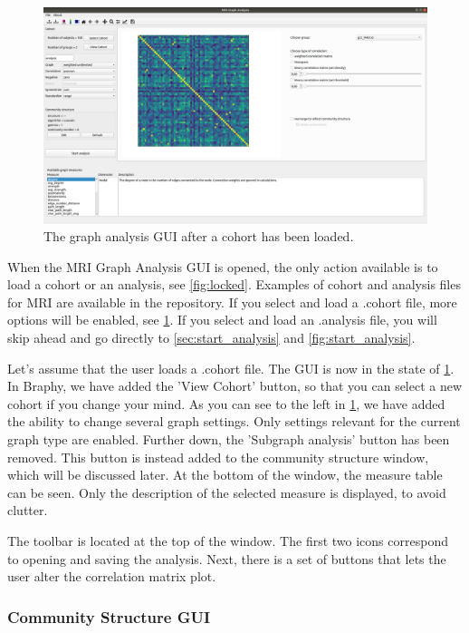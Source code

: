 \documentclass{article}
\begin{document}
\begin{figure}[h]
    \centering
    \includegraphics[width=\linewidth]{graph_analysis_cohort.png}
    \caption{The graph analysis GUI after a cohort has been loaded.}
    \label{fig:started}
\end{figure}

When the MRI Graph Analysis GUI is opened, the only action available is to load a cohort or an analysis, see \cref{fig:locked}. Examples of cohort and analysis files for MRI are available in the repository. If you select and load a .cohort file, more options will be enabled, see \cref{fig:started}. If you select and load an .analysis file, you will skip ahead and go directly to \cref{sec:start_analysis} and \cref{fig:start_analysis}.

Let's assume that the user loads a .cohort file. The GUI is now in the state of \cref{fig:started}. In Braphy, we have added the 'View Cohort' button, so that you can select a new cohort if you change your mind. As you can see to the left in \cref{fig:started}, we have added the ability to change several graph settings. Only settings relevant for the current graph type are enabled. Further down, the 'Subgraph analysis' button has been removed. This button is instead added to the community structure window, which will be discussed later. At the bottom of the window, the measure table can be seen. Only the description of the selected measure is displayed, to avoid clutter. 

The toolbar is located at the top of the window. The first two icons correspond to opening and saving the analysis. Next, there is a set of buttons that lets the user alter the correlation matrix plot.

\subsubsection{Community Structure GUI}
\end{document}
